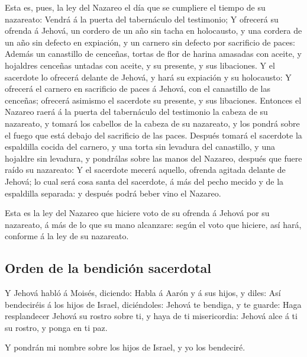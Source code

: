  Esta es, pues, la ley del Nazareo el día que se
cumpliere el tiempo de su nazareato: Vendrá á la puerta del tabernáculo
del testimonio;  Y ofrecerá su ofrenda á Jehová, un
cordero de un año sin tacha en holocausto, y una cordera de un año sin
defecto en expiación, y un carnero sin defecto por sacrificio de paces:
 Además un canastillo de cenceñas, tortas de flor de
harina amasadas con aceite, y hojaldres cenceñas untadas con aceite, y
su presente, y sus libaciones.  Y el sacerdote lo
ofrecerá delante de Jehová, y hará su expiación y su holocausto:
 Y ofrecerá el carnero en sacrificio de paces á Jehová,
con el canastillo de las cenceñas; ofrecerá asimismo el sacerdote su
presente, y sus libaciones.  Entonces el Nazareo raerá á
la puerta del tabernáculo del testimonio la cabeza de su nazareato, y
tomará los cabellos de la cabeza de su nazareato, y los pondrá sobre el
fuego que está debajo del sacrificio de las paces. 
Después tomará el sacerdote la espaldilla cocida del carnero, y una
torta sin levadura del canastillo, y una hojaldre sin levadura, y
pondrálas sobre las manos del Nazareo, después que fuere raído su
nazareato:  Y el sacerdote mecerá aquello, ofrenda
agitada delante de Jehová; lo cual será cosa santa del sacerdote, á más
del pecho mecido y de la espaldilla separada: y después podrá beber vino
el Nazareo.

 Esta es la ley del Nazareo que hiciere voto de su
ofrenda á Jehová por su nazareato, á más de lo que su mano alcanzare:
según el voto que hiciere, así hará, conforme á la ley de su nazareato.

\hypertarget{orden-de-la-bendiciuxf3n-sacerdotal}{%
\subsection{Orden de la bendición
sacerdotal}\label{orden-de-la-bendiciuxf3n-sacerdotal}}

 Y Jehová habló á Moisés, diciendo:  Habla
á Aarón y á sus hijos, y diles: Así bendeciréis á los hijos de Israel,
diciéndoles:  Jehová te bendiga, y te guarde:
 Haga resplandecer Jehová su rostro sobre ti, y haya de
ti misericordia:  Jehová alce á ti su rostro, y ponga en
ti paz.

 Y pondrán mi nombre sobre los hijos de Israel, y yo los
bendeciré.

